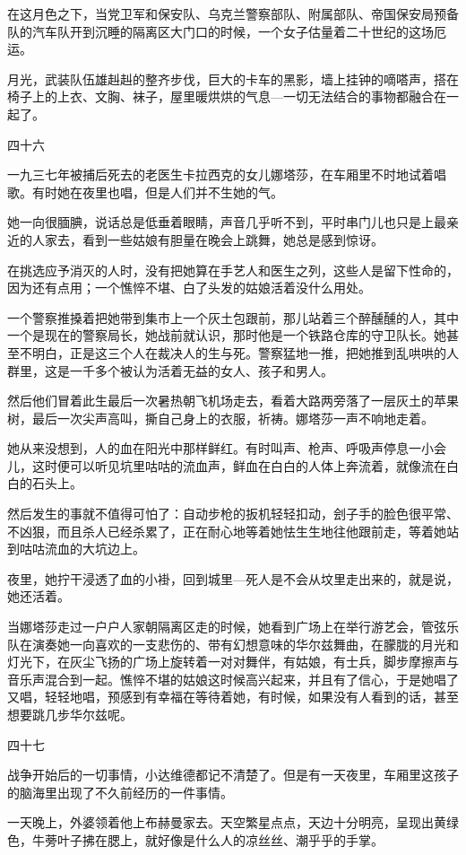 在这月色之下，当党卫军和保安队、乌克兰警察部队、附属部队、帝国保安局预备队的汽车队开到沉睡的隔离区大门口的时候，一个女子估量着二十世纪的这场厄运。

月光，武装队伍雄赳赳的整齐步伐，巨大的卡车的黑影，墙上挂钟的嘀嗒声，搭在椅子上的上衣、文胸、袜子，屋里暖烘烘的气息—一切无法结合的事物都融合在一起了。

四十六

一九三七年被捕后死去的老医生卡拉西克的女儿娜塔莎，在车厢里不时地试着唱歌。有时她在夜里也唱，但是人们并不生她的气。

她一向很腼腆，说话总是低垂着眼睛，声音几乎听不到，平时串门儿也只是上最亲近的人家去，看到一些姑娘有胆量在晚会上跳舞，她总是感到惊讶。

在挑选应予消灭的人时，没有把她算在手艺人和医生之列，这些人是留下性命的，因为还有点用；一个憔悴不堪、白了头发的姑娘活着没什么用处。

一个警察推搡着把她带到集市上一个灰土包跟前，那儿站着三个醉醺醺的人，其中一个是现在的警察局长，她战前就认识，那时他是一个铁路仓库的守卫队长。她甚至不明白，正是这三个人在裁决人的生与死。警察猛地一推，把她推到乱哄哄的人群里，这是一千多个被认为活着无益的女人、孩子和男人。

然后他们冒着此生最后一次暑热朝飞机场走去，看着大路两旁落了一层灰土的苹果树，最后一次尖声高叫，撕自己身上的衣服，祈祷。娜塔莎一声不响地走着。

她从来没想到，人的血在阳光中那样鲜红。有时叫声、枪声、呼吸声停息一小会儿，这时便可以听见坑里咕咕的流血声，鲜血在白白的人体上奔流着，就像流在白白的石头上。

然后发生的事就不值得可怕了：自动步枪的扳机轻轻扣动，刽子手的脸色很平常、不凶狠，而且杀人已经杀累了，正在耐心地等着她怯生生地往他跟前走，等着她站到咕咕流血的大坑边上。

夜里，她拧干浸透了血的小褂，回到城里—死人是不会从坟里走出来的，就是说，她还活着。

当娜塔莎走过一户户人家朝隔离区走的时候，她看到广场上在举行游艺会，管弦乐队在演奏她一向喜欢的一支悲伤的、带有幻想意味的华尔兹舞曲，在朦胧的月光和灯光下，在灰尘飞扬的广场上旋转着一对对舞伴，有姑娘，有士兵，脚步摩擦声与音乐声混合到一起。憔悴不堪的姑娘这时候高兴起来，并且有了信心，于是她唱了又唱，轻轻地唱，预感到有幸福在等待着她，有时候，如果没有人看到的话，甚至想要跳几步华尔兹呢。

四十七

战争开始后的一切事情，小达维德都记不清楚了。但是有一天夜里，车厢里这孩子的脑海里出现了不久前经历的一件事情。

一天晚上，外婆领着他上布赫曼家去。天空繁星点点，天边十分明亮，呈现出黄绿色，牛蒡叶子拂在腮上，就好像是什么人的凉丝丝、潮乎乎的手掌。

